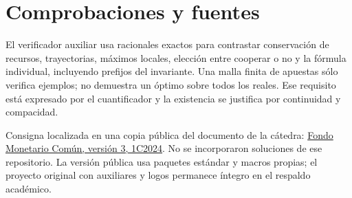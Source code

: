 \documentclass[11pt,a4paper]{article}
\begin{document}
\section{Comprobaciones y fuentes}
El verificador auxiliar usa racionales exactos para contrastar conservación
de recursos, trayectorias, máximos locales, elección entre cooperar o no
y la fórmula individual, incluyendo prefijos del invariante.
Una malla finita de apuestas sólo verifica ejemplos; no demuestra un
óptimo sobre todos los reales. Ese requisito está expresado por el
cuantificador y la existencia se justifica por continuidad y compacidad.

Consigna localizada en una copia pública del documento de la cátedra:
\href{https://github.com/SashaBerkowsky/AyED-II/blob/42722b4636a1e8e3550f9c6500d3e3ed61e67792/Trabajos\%20Pr\%C3\%A1cticos/TP1/enunciado.pdf}{Fondo Monetario Común, versión 3, 1C2024}.
No se incorporaron soluciones de ese repositorio.
La versión pública usa paquetes estándar y macros propias; el proyecto
original con auxiliares y logos permanece íntegro en el respaldo académico.
\end{document}
